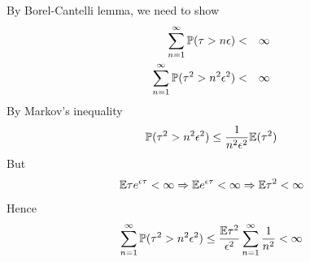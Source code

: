 \documentclass{beamer}
\begin{document}
\begin{frame}
  By Borel-Cantelli lemma, we need to show
  \begin{eqnarray*}
    \sum_{n=1}^\infty \P(\tau > n\epsilon) &<& \infty \\
    \sum_{n=1}^\infty \P(\tau^2 > n^2\epsilon^2) &<& \infty \\
  \end{eqnarray*}
  By Markov's inequality
  \[
  \P(\tau^2 > n^2\epsilon^2) \leq {1 \over n^2 \epsilon^2} \E(\tau^2)
  \]
  But
  \[
  \E \tau e^{\epsilon \tau} < \infty \Rightarrow
  \E e^{\epsilon \tau} < \infty \Rightarrow
  \E \tau^2 < \infty
  \]
  Hence
  \[
  \sum_{n=1}^\infty \P(\tau^2 > n^2\epsilon^2) \leq
  {
    \E \tau^2
    \over
    \epsilon^2
  }
\sum_{n=1}^\infty  {1 \over n^2} < \infty
  \]
\end{frame}



\end{document}
